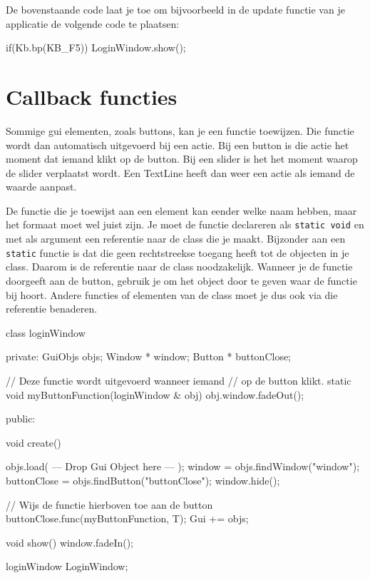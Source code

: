 De bovenstaande code laat je toe om bijvoorbeeld in de update functie van je applicatie de volgende code te plaatsen:

\begin{code}
if(Kb.bp(KB_F5)) LoginWindow.show();
\end{code}

\section{Callback functies}
Sommige gui elementen, zoals buttons, kan je een functie toewijzen. Die functie wordt dan automatisch uitgevoerd bij een actie. Bij een button is die actie het moment dat iemand klikt op de button. Bij een slider is het het moment waarop de slider verplaatst wordt. Een TextLine heeft dan weer een actie als iemand de waarde aanpast.

De functie die je toewijst aan een element kan eender welke naam hebben, maar het formaat moet wel juist zijn. Je moet de functie declareren als \texttt{static void} en met als argument een referentie naar de class die je maakt. Bijzonder aan een \texttt{static} functie is dat die geen rechtstreekse toegang heeft tot de objecten in je class. Daarom is de referentie naar de class noodzakelijk. Wanneer je de functie doorgeeft aan de button, gebruik je  om het object door te geven waar de functie bij hoort. Andere functies of elementen van de class moet je dus ook via die referentie benaderen.

\begin{code}
class loginWindow
{
private:
   GuiObjs objs;
	 Window * window;
	 Button * buttonClose;
    
	 // Deze functie wordt uitgevoerd wanneer iemand
	 // op de button klikt.
   static void myButtonFunction(loginWindow & obj) {
		  obj.window.fadeOut();
	 }
	
public:

   void create()
   {
      objs.load( --- Drop Gui Object here --- );
      window = objs.findWindow("window");
			buttonClose = objs.findButton("buttonClose");
			window.hide();
			
			// Wijs de functie hierboven toe aan de button
			buttonClose.func(myButtonFunction, T);
      Gui += objs;
   }
	
	 void show() {
	    window.fadeIn();
   }
}
loginWindow LoginWindow;
\end{code}

